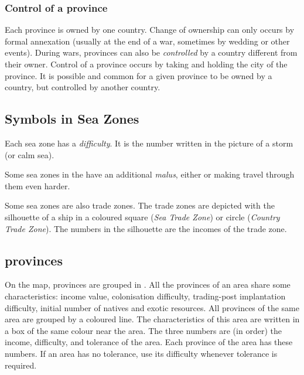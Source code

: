 \subsubsection{Control of a province}
\aparag Each province is owned by one country.
\bparag Change of ownership can only occurs by formal annexation (usually at
the end of a war, sometimes by wedding or other events).
\aparag During wars, provinces can also be \emph{controlled} by a country
different from their owner.
\bparag Control of a province occurs by taking and holding the city of the
province.
\aparag It is possible and common for a given province to be owned by a
country, but controlled by another country.



\subsection{Symbols in Sea Zones}

\aparag Each sea zone has a \emph{difficulty}. It is the number written in the
picture of a storm (or calm sea).

\aparag Some sea zones in the \ROTW have an additional \emph{malus}, either
 or  making travel through them even harder.

\aparag Some sea zones are also trade zones. The trade zones are depicted with
the silhouette of a ship in a coloured square (\emph{Sea Trade Zone}) or
circle (\emph{Country Trade Zone}).
\bparag The numbers in the silhouette are the incomes of the trade zone.



\subsection{\ROTW provinces}\label{chBasics:ROTW Areas}

\aparag On the \ROTW map, provinces are grouped in . All the
provinces of an area share some characteristics: income value, colonisation
difficulty, trading-post implantation difficulty, initial number of natives
and exotic resources.
\bparag All provinces of the same area are grouped by a coloured line. The
characteristics of this area are written in a box of the same colour near the
area.
\aparag The three numbers are (in order) the income, difficulty, and tolerance
of the area.
\bparag Each province of the area has these numbers.
\bparag If an area has no tolerance, use its difficulty whenever tolerance is
required.

